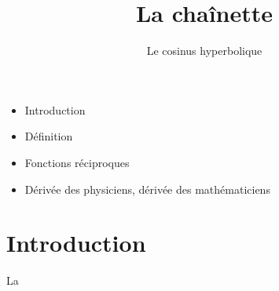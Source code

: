 

   





\title{{\bf La chaînette}}
\subtitle{Le cosinus hyperbolique}

\begin{frame}
  
  \debutmontitre

  \pause

{\footnotesize
\hfill
{}
\begin{minipage}{0.6\textwidth}
  \begin{itemize}
    \item<3-> Introduction
    \item<4-> Définition
    \item<5-> Fonctions réciproques
    \item<6-> Dérivée des physiciens, dérivée des mathématiciens
  \end{itemize}
\end{minipage}
}

\end{frame}

\setcounter{framenumber}{0}


\section{Introduction}

\begin{frame}
\begin{minipage}{0.39\textwidth}
La 


\bigskip


\bigskip

\end{minipage}
\begin{minipage}{0.5\textwidth}
\end{minipage}

\end{frame}

